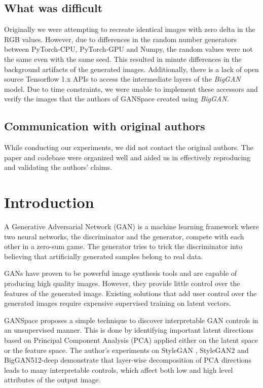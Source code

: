 \subsection*{What was difficult}

Originally we were attempting to recreate identical images with zero delta in the RGB values. However, due to differences in the random number generators between PyTorch-CPU, PyTorch-GPU and Numpy, the random values were not the same even with the same seed. This resulted in minute differences in the background artifacts of the generated images. Additionally, there is a lack of open source Tensorflow 1.x APIs to access the intermediate layers of the \textit{BigGAN} model. Due to time constraints, we were unable to implement these accessors and verify the images that the authors of GANSpace created using \textit{BigGAN}.

\subsection*{Communication with original authors}

While conducting our experiments, we did not contact the original authors. The paper and codebase were organized well and aided us in effectively reproducing and validating the authors' claims.

\newpage

\section{Introduction}

A Generative Adversarial Network (GAN) \cite{gan} is a machine learning framework where two neural networks, the discriminator and the generator, compete with each other in a zero-sum game. The generator tries to trick the discriminator into believing that artificially generated samples belong to real data.

GANs have proven to be powerful image synthesis tools and are capable of producing high quality images. However, they provide little control over the features of the generated image. Existing solutions \cite{supervised} that add user control over the generated images require expensive supervised training on latent vectors.

GANSpace \cite{GANSpace} proposes a simple technique to discover interpretable GAN controls in an unsupervised manner. This is done by identifying important latent directions based on Principal Component Analysis (PCA) applied either on the latent space or the feature space. The author's experiments on StyleGAN \cite{stylegan}, StyleGAN2 \cite{stylegan2} and BigGAN512-deep \cite{biggan} demonstrate that layer-wise decomposition of PCA directions leads to many interpretable controls, which affect both low and high level attributes of the output image.


